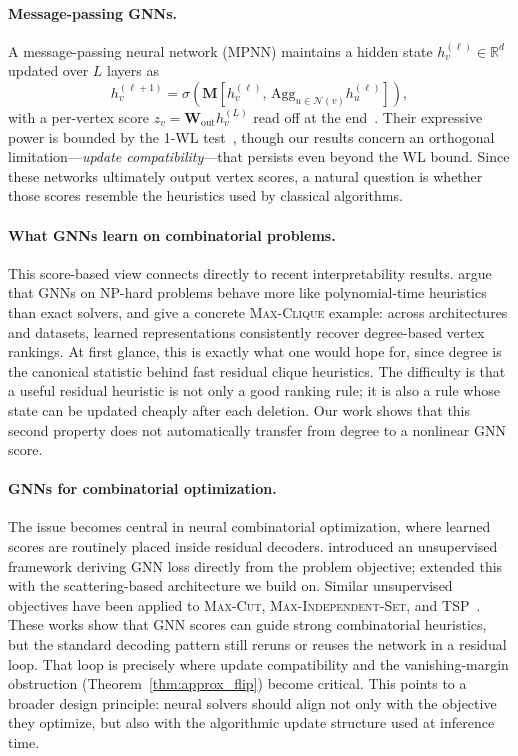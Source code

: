 \documentclass[11pt]{article}
\theoremstyle{plain}
\theoremstyle{remark}
\begin{document}
\paragraph{Message-passing GNNs.}
A message-passing neural network (MPNN) maintains a hidden state
$h_v^{(\ell)} \in \mathbb{R}^d$ updated over $L$ layers as
\[
  h_v^{(\ell+1)}
  =
  \sigma\!\left(
    \mathbf{M}\!\left[
      h_v^{(\ell)},\,
      \mathrm{Agg}_{u\in\mathcal{N}(v)} h_u^{(\ell)}
    \right]
  \right),
\]
with a per-vertex score $z_v = \mathbf{W}_{\mathrm{out}} h_v^{(L)}$ read off at the
end~\citep{xu2019}. Their expressive power is bounded by the 1-WL test~\citep{xu2019,
morris2019}, though our results concern an orthogonal limitation---\emph{update
compatibility}---that persists even beyond the WL bound. Since these networks
ultimately output vertex scores, a natural question is whether those scores resemble
the heuristics used by classical algorithms.

\paragraph{What GNNs learn on combinatorial problems.}
This score-based view connects directly to recent interpretability results.
\citet{cappart2023} argue that GNNs on NP-hard problems behave more like
polynomial-time heuristics than exact solvers, and \citet{shoham2026ltr} give a
concrete \textsc{Max-Clique} example: across architectures and datasets, learned
representations consistently recover degree-based vertex rankings. At first glance,
this is exactly what one would hope for, since degree is the canonical statistic behind
fast residual clique heuristics. The difficulty is that a useful residual heuristic is
not only a good ranking rule; it is also a rule whose state can be updated cheaply
after each deletion. Our work shows that this second property does not automatically
transfer from degree to a nonlinear GNN score.

\paragraph{GNNs for combinatorial optimization.}
The issue becomes central in neural combinatorial optimization, where learned scores
are routinely placed inside residual decoders. \citet{karalias2020} introduced an
unsupervised framework deriving GNN loss directly from the problem objective;
\citet{min2022} extended this with the scattering-based architecture we build on.
Similar unsupervised objectives have been applied to \textsc{Max-Cut},
\textsc{Max-Independent-Set}, and \textsc{TSP}~\citep{schuetz2022,garmendia2024}.
These works show that GNN scores can guide strong combinatorial heuristics, but the
standard decoding pattern still reruns or reuses the network in a residual loop. That
loop is precisely where update compatibility and the vanishing-margin obstruction
(Theorem~\ref{thm:approx_flip}) become critical. This points to a broader design
principle: neural solvers should align not only with the objective they optimize, but
also with the algorithmic update structure used at inference time.
\end{document}
